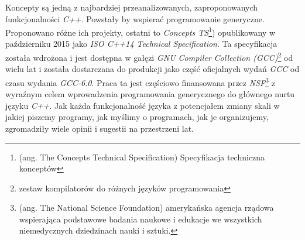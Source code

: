\documentclass[11pt, a4paper]{article}
\begin{document}
Koncepty są jedną z najbardziej przeanalizowanych, zaproponowanych funkcjonalności \emph{C++}. Powstały by wspierać programowanie generyczne. Proponowano różne ich projekty, ostatni to \emph{Concepts TS}\footnote{(ang. The Concepts Technical Specification) Specyfikacja techniczna konceptów}) opublikowany w październiku 2015 jako \emph{ISO C++14 Technical Specification}. Ta specyfikacja została wdrożona i jest dostępna w gałęzi \emph{GNU Compiler Collection (GCC)}\footnote{zestaw kompilatorów do różnych języków programowania} od wielu lat i została dostarczana do produkcji jako część oficjalnych wydań \emph{GCC} od czasu wydania \emph{GCC-6.0}. Praca ta jest częściowo finansowana przez \emph{NSF}\footnote{(ang. The National Science Foundation) amerykańska agencja rządowa wspierająca podstawowe badania naukowe i edukacje we wszystkich niemedycznych dziedzinach nauki i sztuki.} z wyraźnym celem wprowadzenia programowania generycznego do głównego nurtu języku \emph{C++}. Jak każda funkcjonalność języka z potencjałem zmiany skali w jakiej piszemy programy, jak myślimy o programach, jak je organizujemy, zgromadziły wiele opinii i sugestii na przestrzeni lat.


\end{document}
